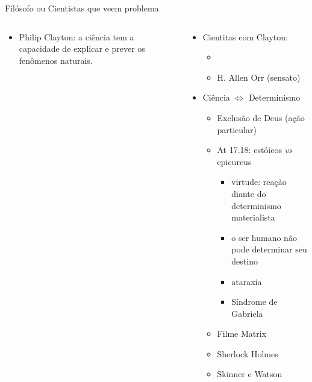 \begin{frame}{Filósofo ou Cientistas que veem problema}
 \begin{columns}
	 \begin{column}{0.45\textwidth}
	  \begin{itemize}
			 \justifying
		  \item<2-3,8-14>[$\bullet$] \textcolor{NordBrightCyan}{Philip Clayton}: a ciência 
				 tem a capacidade de explicar e prever os fenômenos naturais.
	  \end{itemize}
			\vspace{0.5cm}
			\centering
		\end{column}
		\begin{column}{0.55\textwidth}
		 \begin{itemize}
			 \item<3-> Cientitas com Clayton: 
				 \begin{itemize}
					 \item<4->  \onslide<6->{(loucos?)}
					 \item<7-> H. Allen Orr (sensato)
					\end{itemize}
				\item<8-|alert@8> Ciência $\Longleftrightarrow$ \textcolor{NordYellow}{Determinismo}
					\begin{itemize}
						\item<9-> Exclusão de Deus (ação particular)
						\item<10-> At 17.18: estóicos \textit{vs} epicureus
							\begin{itemize}
								\item<11-> virtude: reação diante do determinismo materialista
								\item<12-> o ser humano não pode determinar seu destino
								\item<13-> ataraxia
								\item<14-> Síndrome de Gabriela
							\end{itemize}
						\item<15-> Filme Matrix
						\item<16-> Sherlock Holmes
						\item<17-> Skinner e Watson
					\end{itemize}
			\end{itemize}
		\end{column}
	\end{columns}
\end{frame}

